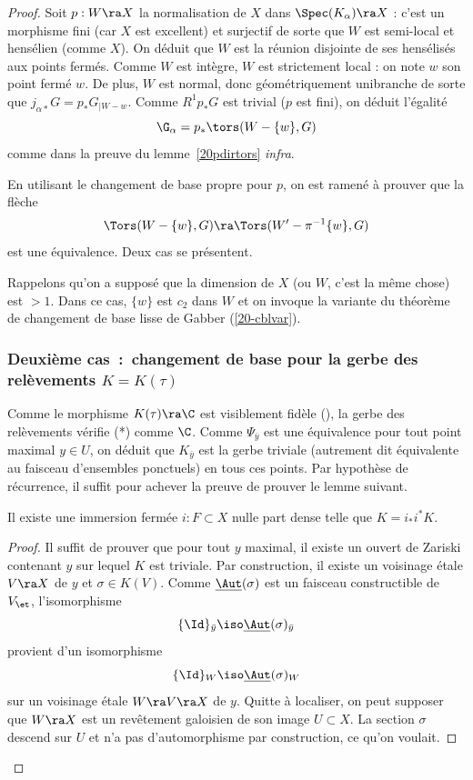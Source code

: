 \documentclass[10pt]{../fichiers-configuration-latex/smfart}
\begin{document}
\begin{proof}
Soit $p:W\ra X$ la normalisation de $X$ dans $\Spec(K_\alpha)\ra X$ : c'est un morphisme fini (car
$X$ est excellent) et surjectif de sorte que  $W$ est semi-local et hensélien (comme $X$). On déduit
que $W$ est la réunion disjointe de ses hensélisés aux points fermés. Comme $W$ est intègre,  $W$
est  strictement local : on note $w$ son point fermé $w$. De plus, $W$ est normal, donc
géométriquement unibranche de sorte que $j_{\alpha *}G=p_*G_{|W-w}$. Comme $R^1p_*G$ est trivial
($p$ est fini), on déduit l'égalité $$\G_\alpha=p_*\tors(W-\{w\},G)$$ comme dans la preuve du
lemme~\ref{20pdirtors} \textit{infra}.


 En utilisant le changement de base propre pour $p$, on est ramené à prouver que la flèche
$$\Tors(W-\{w\},G)\ra\Tors(W'-\pi^{-1}\{w\},G)$$ est une équivalence. Deux cas se
présentent.

Rappelons qu'on a supposé que la dimension de $X$ (ou $W$, c'est la même chose) est  $>1$. Dans ce
cas, $\{w\}$ est $c_2$ dans $W$ et on invoque la variante du théorème de changement de base lisse de
Gabber (\ref{20-cblvar}).

\subsubsection{Deuxième cas : changement de base pour la gerbe des
relèvements $K=K(\tau)$}

Comme le morphisme $K(\tau)\ra \C$ est visiblement fidèle (\cite[IV.2.5.2]{CNA@Giraud}), la gerbe
des relèvements vérifie (*) comme $\C$. Comme $\Psi_{\bar y}$ est une équivalence pour tout point
maximal $y\in U$, on déduit que $K_{\bar y}$ est la gerbe triviale (autrement dit équivalente au
faisceau d'ensembles ponctuels) en tous ces points. Par hypothèse de récurrence, il suffit pour
achever la preuve de prouver le lemme suivant.

\begin{lemme2} Il existe une immersion fermée
$i:F\subset X$ nulle part dense telle que $K=i_*i^*K$.
\end{lemme2}

\begin{proof}Il suffit de prouver que pour tout $y$ maximal, il existe un ouvert de Zariski
contenant $y$ sur lequel $K$ est triviale. Par construction, il existe un voisinage étale $V\ra X$
de $y$ et $\sigma\in K(V)$. Comme $\underline{\Aut}(\sigma)$ est un faisceau constructible de
$V_\et$, l'isomorphisme $$\{\Id\}_{\bar y}\iso\underline{\Aut}(\sigma)_{\bar y}$$ provient
d'un isomorphisme $$\{\Id\}_{W}\iso\underline{\Aut}(\sigma)_W$$ sur un voisinage étale $W\ra
V\ra X$ de $y$. Quitte à localiser, on peut supposer que $W\ra X$ est un revêtement galoisien de son
image $U\subset X$. La section $\sigma$ descend sur $U$ et n'a pas d'automorphisme par construction,
ce qu'on voulait.  \end{proof} \end{proof}
\end{document}
